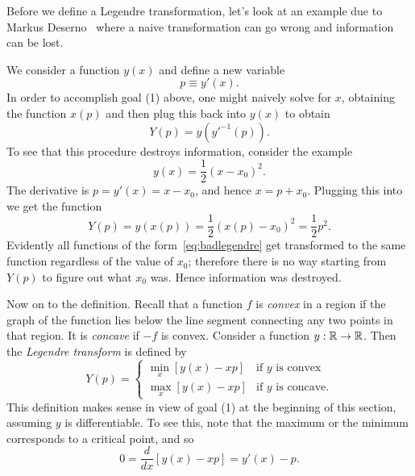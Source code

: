 Before we define a Legendre transformation, let's look at an example
due to Markus Deserno~\cite{deserno} where a naive transformation can go
wrong and information can be lost. 
\begin{example*}{}
We consider a function $y(x)$ and define a new variable
\begin{equation}\label{eq:xlegendre}
  p\equiv y'(x).
\end{equation}
In order to accomplish goal (1) above, one might naively solve
 for $x$, obtaining the function $x(p)$
and then plug this back into $y(x)$ to obtain
\begin{equation}
  Y(p)=y\left(y'^{-1}(p)\right).
\end{equation}
To see that this procedure destroys information, consider the example
\begin{equation}\label{eq:badlegendre}
  y(x)=\frac{1}{2}(x-x_0)^2.
\end{equation}
The derivative is $p=y'(x)=x-x_0$, and hence $x=p+x_0$. Plugging this
into  we get the function
\begin{equation}
  Y(p)=y(x(p))=\frac{1}{2}\left(x(p)-x_0\right)^2=\frac{1}{2}p^2.
\end{equation}
Evidently all functions of the form~\eqref{eq:badlegendre} get transformed
to the same function regardless of the value of $x_0$; therefore there is
no way starting from $Y(p)$ to figure out what $x_0$ was. Hence
information was destroyed.
\end{example*}

Now on to the definition. Recall that a function $f$ is {\it convex}
 in a region if the graph of the function lies 
below the line segment connecting any two points in that region. It is 
{\it concave} if $-f$ is convex. Consider
a function $y:\mathbb{R}\to\mathbb{R}$. Then the 
{\it Legendre transform} is defined by
\begin{equation}
Y(p)=\begin{cases}
  \min_x [y(x)-xp] & \text{if $y$ is convex}\\
  \max_x [y(x)-xp] & \text{if $y$ is concave.}
\end{cases}
\end{equation}
This definition makes sense in view of goal (1) at the beginning of this
section, assuming $y$ is differentiable. To see this, note that the maximum
or the minimum corresponds to a critical point, and so
\begin{equation}\label{eq:legendremin}
  0=\frac{d}{dx}\left[y(x)-xp\right]=y'(x)-p.
\end{equation}

